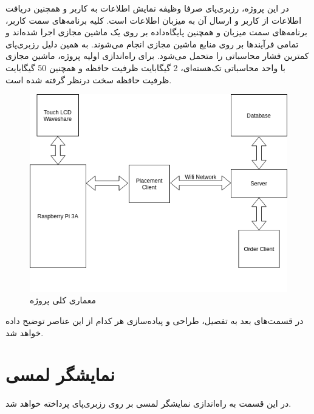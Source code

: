در این پروژه، رزبری‌پای صرفا وظیفه نمایش اطلاعات به کاربر و همچنین دریافت اطلاعات از کاربر و ارسال آن به میزبان اطلاعات است. کلیه برنامه‌های سمت کاربر، برنامه‌های سمت میزبان و همچنین پایگاه‌داده بر روی یک ماشین مجازی اجرا شده‌اند و تمامی فرآیندها بر روی منابع ماشین مجازی انجام می‌شوند. به همین دلیل رزبری‌پای کمترین فشار محاسباتی را متحمل می‌شود.
برای راه‌اندازی اولیه پروژه، ماشین مجازی با واحد محاسباتی تک‌هسته‌ای، 2 گیگابایت ظرفیت حافظه و همچنین 50 گیگابایت ظرفیت حافظه سخت درنظر گرفته شده است.
\begin{figure}[t!]
    \centering
    \includegraphics[scale=0.75]{figures/pro.png}
    \caption{معماری کلی پروژه}
    \label{arc1}
\end{figure}

در قسمت‌های بعد به تفصیل، طراحی و پیاده‌سازی هر کدام از این عناصر توضیح داده خواهد شد.

\section{نمایشگر لمسی}
در این قسمت به راه‌اندازی نمایشگر لمسی بر روی رزبری‌پای پرداخته خواهد شد.

